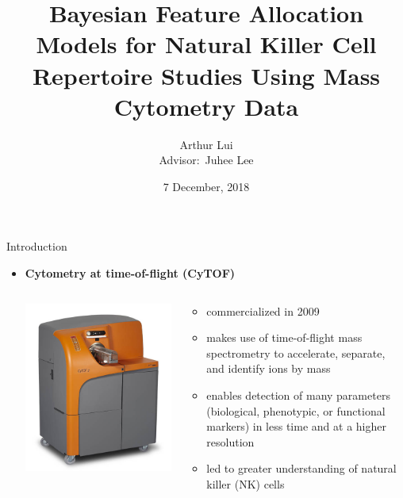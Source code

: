 \documentclass[ignorenonframetext,]{beamer}
\title[Bayesian FAM for CyTOF Data]{Bayesian Feature Allocation Models for Natural Killer Cell Repertoire Studies Using Mass Cytometry Data}
\author[A. Lui]{Arthur Lui \\ {\small Advisor$\colon$ Juhee Lee}}
\institute{Department of Applied Mathematics and Statistics\\ UC Santa Cruz}
\begin{document}
\begin{frame}
\date{7 December, 2018}
\titlepage
\end{frame}

\begin{frame}{Introduction}
\begin{itemize}
\item
  \textbf{Cytometry at time-of-flight (CyTOF)} \setlength\itemsep{1em}
  \begin{minipage}{\textwidth}
  \begin{columns}[T]
  \begin{column}{0.1\textwidth}
  \vspace{5em}
  \includegraphics[scale=0.5]{img/CyTOF_instrument.jpg}
  \end{column}
  \begin{column}{0.6\textwidth}
  \begin{itemize}
  \item
  commercialized in 2009
  \item 
  makes use of time-of-flight mass spectrometry to accelerate, separate, and
  identify ions by mass
  \item
  enables detection of many parameters (biological, phenotypic, or functional
  markers) in less time and at a higher resolution \citep{cheung2011screening}
  \item 
  led to greater understanding of natural killer (NK) cells
  \end{itemize}
  \end{column}
  \end{columns}
  \end{minipage}
\end{itemize}
\end{frame}
\end{document}
